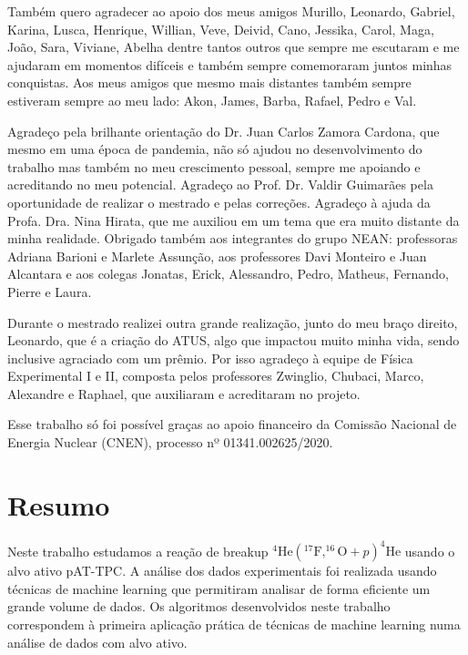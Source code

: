\documentclass[a4paper,12pt,oneside]{book}
\begin{document}
\par Também quero agradecer ao apoio dos meus amigos Murillo, Leonardo, Gabriel, Karina, Lusca, Henrique, Willian, Veve, Deivid, Cano, Jessika, Carol, Maga, João, Sara, Viviane, Abelha dentre tantos outros que sempre me escutaram e me ajudaram em momentos difíceis e também sempre comemoraram juntos minhas conquistas. Aos meus amigos que mesmo mais distantes também sempre estiveram sempre ao meu lado: Akon, James, Barba, Rafael, Pedro e Val.

\par Agradeço pela brilhante orientação do Dr. Juan Carlos Zamora Cardona, que mesmo em uma época de pandemia, não só ajudou no desenvolvimento do trabalho mas também no meu crescimento pessoal, sempre me apoiando e acreditando no meu potencial. Agradeço ao Prof. Dr. Valdir Guimarães pela oportunidade de realizar o mestrado e pelas correções. Agradeço à ajuda da Profa. Dra. Nina Hirata, que me auxiliou em um tema que era muito distante da minha realidade. Obrigado também aos integrantes do grupo NEAN: professoras Adriana Barioni e Marlete Assunção, aos professores Davi Monteiro e Juan Alcantara e aos colegas Jonatas, Erick, Alessandro, Pedro, Matheus, Fernando, Pierre e Laura.

\par Durante o mestrado realizei outra grande realização, junto do meu braço direito, Leonardo, que é a criação do ATUS, algo que impactou muito minha vida, sendo inclusive agraciado com um prêmio. Por isso agradeço à equipe de Física Experimental I e II, composta pelos professores Zwinglio, Chubaci, Marco, Alexandre e Raphael, que auxiliaram e acreditaram no projeto.

\par Esse trabalho só foi possível graças ao apoio financeiro da Comissão Nacional de Energia Nuclear (CNEN), processo nº 01341.002625/2020.



\chapter*{Resumo}
\thispagestyle{empty}
\par Neste trabalho estudamos a reação de breakup $^4\mathrm{He}(^{17}\mathrm{F},^{16}\mathrm{O}+p)^4\mathrm{He}$ usando o alvo ativo pAT-TPC. A análise dos dados experimentais foi realizada usando técnicas de machine learning que permitiram analisar de forma eficiente um grande volume de dados. Os algoritmos desenvolvidos neste trabalho correspondem à primeira aplicação prática de técnicas de machine learning numa análise de dados com alvo ativo.
\end{document}
